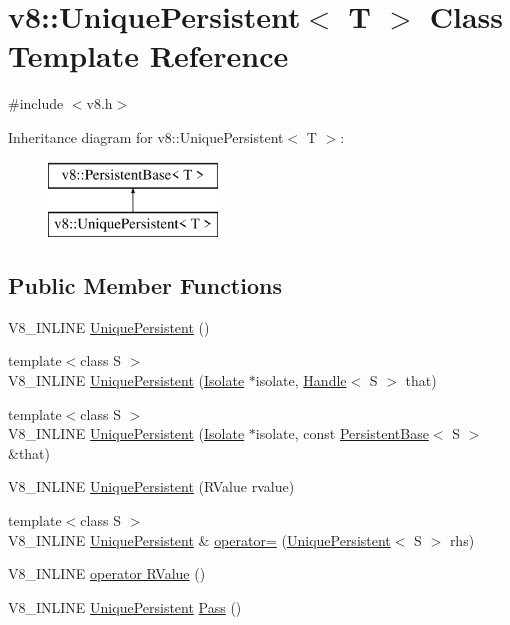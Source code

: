 \hypertarget{classv8_1_1_unique_persistent}{}\section{v8\+:\+:Unique\+Persistent$<$ T $>$ Class Template Reference}
\label{classv8_1_1_unique_persistent}


{\ttfamily \#include $<$v8.\+h$>$}

Inheritance diagram for v8\+:\+:Unique\+Persistent$<$ T $>$\+:\begin{figure}[H]
\begin{center}
\leavevmode
\includegraphics[height=2.000000cm]{classv8_1_1_unique_persistent}
\end{center}
\end{figure}
\subsection*{Public Member Functions}
\begin{DoxyCompactItemize}
\item 
V8\+\_\+\+I\+N\+L\+I\+N\+E \hyperlink{classv8_1_1_unique_persistent_adab1460f2350842ea97e9ac63b3b3692}{Unique\+Persistent} ()
\item 
{\footnotesize template$<$class S $>$ }\\V8\+\_\+\+I\+N\+L\+I\+N\+E \hyperlink{classv8_1_1_unique_persistent_af7dbba9e4b73104d0a1950c215426a57}{Unique\+Persistent} (\hyperlink{classv8_1_1_isolate}{Isolate} $\ast$isolate, \hyperlink{classv8_1_1_handle}{Handle}$<$ S $>$ that)
\item 
{\footnotesize template$<$class S $>$ }\\V8\+\_\+\+I\+N\+L\+I\+N\+E \hyperlink{classv8_1_1_unique_persistent_a795e5299871d11469dc2e1c637eb76fa}{Unique\+Persistent} (\hyperlink{classv8_1_1_isolate}{Isolate} $\ast$isolate, const \hyperlink{classv8_1_1_persistent_base}{Persistent\+Base}$<$ S $>$ \&that)
\item 
V8\+\_\+\+I\+N\+L\+I\+N\+E \hyperlink{classv8_1_1_unique_persistent_a73c1edaf902755a71c1236f91388ef5a}{Unique\+Persistent} (R\+Value rvalue)
\item 
{\footnotesize template$<$class S $>$ }\\V8\+\_\+\+I\+N\+L\+I\+N\+E \hyperlink{classv8_1_1_unique_persistent}{Unique\+Persistent} \& \hyperlink{classv8_1_1_unique_persistent_aa533c3aff16091f332a0f892a658e70c}{operator=} (\hyperlink{classv8_1_1_unique_persistent}{Unique\+Persistent}$<$ S $>$ rhs)
\item 
V8\+\_\+\+I\+N\+L\+I\+N\+E \hyperlink{classv8_1_1_unique_persistent_a06e8c1c5be0b982a02e48e81df0b9794}{operator R\+Value} ()
\item 
V8\+\_\+\+I\+N\+L\+I\+N\+E \hyperlink{classv8_1_1_unique_persistent}{Unique\+Persistent} \hyperlink{classv8_1_1_unique_persistent_a478795270854d31467854df4a9dff553}{Pass} ()
\end{DoxyCompactItemize}


